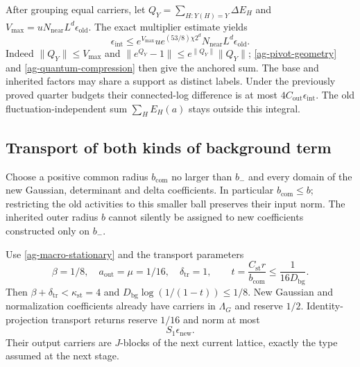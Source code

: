 \documentclass[11pt]{article}
\theoremstyle{remark}
\begin{document}
After grouping equal carriers, let
$Q_Y=\sum_{H:Y(H)=Y}\Delta E_H$ and
$V_{\max}=uN_{\mathrm{near}}L^d\epsilon_{\mathrm{old}}$.
The exact multiplier estimate yields
\begin{equation}\label{ag-inherited-multiplier}
 \epsilon_{\mathrm{int}}
 \le e^{V_{\max}}u e^{(53/8)\chi2^d}
             N_{\mathrm{near}}L^d\epsilon_{\mathrm{old}}.
\end{equation}
Indeed $\|Q_Y\|\le V_{\max}$ and
$\|e^{Q_Y}-1\|\le e^{\|Q_Y\|}\|Q_Y\|$;
\eqref{ag-pivot-geometry} and
\eqref{ag-quantum-compression} then give the anchored sum.
The base and inherited factors may share a support as
distinct labels. Under the previously proved quarter
budgets their connected-log difference is at most
$4C_{\mathrm{out}}\epsilon_{\mathrm{int}}$.
The old fluctuation-independent sum $\sum_HE_H(a)$ stays
outside this integral.

\subsection{Transport of both kinds of background term}

Choose a positive common radius $b_{\mathrm{com}}$ no
larger than $b_-$ and every domain of the new Gaussian,
determinant and delta coefficients. In particular
$b_{\mathrm{com}}\le b$; restricting the old activities to
this smaller ball preserves their input norm. The inherited
outer radius $b$ cannot silently be assigned to new
coefficients constructed only on $b_-$.

Use \eqref{ag-macro-stationary} and the transport parameters
\begin{equation}\label{ag-transport-budget}
 \beta=1/8,\quad a_{\mathrm{out}}=\mu=1/16,\quad
 \delta_{\mathrm{tr}}=1,\qquad
 t=\frac{C_{\mathrm{st}}r}{b_{\mathrm{com}}}
                      \le\frac1{16D_{\mathrm{bg}}}.
\end{equation}
Then $\beta+\delta_{\mathrm{tr}}<\kappa_{\mathrm{st}}=4$
and $D_{\mathrm{bg}}\log(1/(1-t))\le1/8$.
New Gaussian and normalization coefficients already have
carriers in $\Lambda_G$ and reserve $1/2$. Identity-projection
transport returns reserve $1/16$ and norm at most
\begin{equation}\label{ag-new-transport}
 S_1\epsilon_{\mathrm{new}}.
\end{equation}
Their output carriers are $J$-blocks of the next current
lattice, exactly the type assumed at the next stage.
\end{document}
